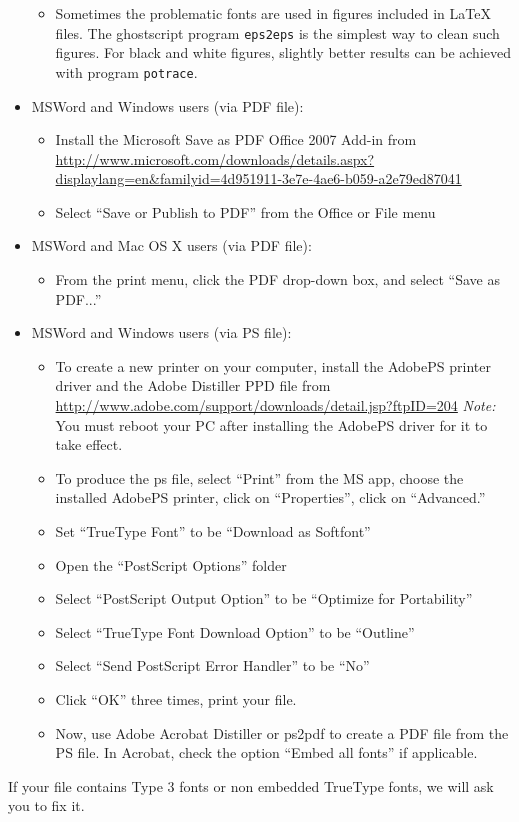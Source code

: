 \documentclass{article} %
\begin{document}
\begin{itemize}
\begin{itemize}
\item Sometimes the problematic fonts are used in figures
included in LaTeX files. The ghostscript program \verb+eps2eps+ is the simplest
way to clean such figures. For black and white figures, slightly better
results can be achieved with program \verb+potrace+.
\end{itemize}
\item MSWord and Windows users (via PDF file):
\begin{itemize}
\item Install the Microsoft Save as PDF Office 2007 Add-in from
\url{http://www.microsoft.com/downloads/details.aspx?displaylang=en\&familyid=4d951911-3e7e-4ae6-b059-a2e79ed87041}
\item Select ``Save or Publish to PDF'' from the Office or File menu
\end{itemize}
\item MSWord and Mac OS X users (via PDF file):
\begin{itemize}
\item From the print menu, click the PDF drop-down box, and select ``Save
as PDF...''
\end{itemize}
\item MSWord and Windows users (via PS file):
\begin{itemize}
\item To create a new printer
on your computer, install the AdobePS printer driver and the Adobe Distiller PPD file from
\url{http://www.adobe.com/support/downloads/detail.jsp?ftpID=204} {\it Note:} You must reboot your PC after installing the
AdobePS driver for it to take effect.
\item To produce the ps file, select ``Print'' from the MS app, choose
the installed AdobePS printer, click on ``Properties'', click on ``Advanced.''
\item Set ``TrueType Font'' to be ``Download as Softfont''
\item Open the ``PostScript Options'' folder
\item Select ``PostScript Output Option'' to be ``Optimize for Portability''
\item Select ``TrueType Font Download Option'' to be ``Outline''
\item Select ``Send PostScript Error Handler'' to be ``No''
\item Click ``OK'' three times, print your file.
\item Now, use Adobe Acrobat Distiller or ps2pdf to create a PDF file from
the PS file. In Acrobat, check the option ``Embed all fonts'' if
applicable.
\end{itemize}

\end{itemize}
If your file contains Type 3 fonts or non embedded TrueType fonts, we will
ask you to fix it. 
\end{document}

